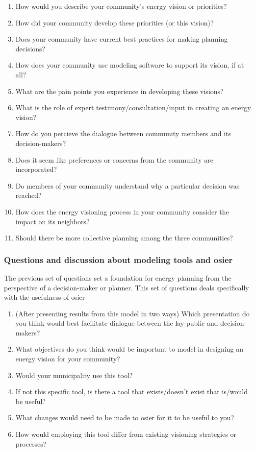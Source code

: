 \begin{enumerate}
    \item How would you describe your community's energy vision or priorities?
    \item How did your community develop these priorities (or this vision)?
    \item Does your community have current best practices for making planning
    decisions?
    \item How does your community use modeling software to support its vision,
    if at all?
    \item What are the pain points you experience in developing these visions?
    \item What is the role of expert testimony/consultation/input in creating an
    energy vision?
    \item How do you percieve the dialogue between community members and its
    decision-makers?
    \item Does it seem like preferences or concerns from the community are
    incorporated? 
    \item Do members of your community understand why a particular decision was
    reached?
    \item How does the energy visioning process in your community consider the
    impact on its neighbors?
    \item Should there be more collective planning among the three communities?
\end{enumerate}

\subsubsection{Questions and discussion about modeling tools and \ac{osier}} The
previous set of questions set a foundation for energy planning from the
perspective of a decision-maker or planner. This set of questions deals
specifically with the usefulness of \ac{osier} 

\begin{enumerate}
    \item (After presenting results from this model in two ways) Which
    presentation do you think would best facilitate dialogue between the
    lay-public and decision-makers?
    \item What objectives do you think would be important to model in designing
    an energy vision for your community?
    \item Would your municipality use this tool? 
    \item If not this specific tool, is there a tool that exists/doesn't exist
    that is/would be useful?
    \item What changes would need to be made to \ac{osier} for it to be useful
    to you?
    \item How would employing this tool differ from existing visioning
    strategies or processes?
\end{enumerate}

